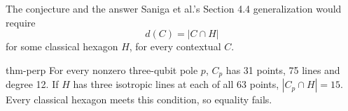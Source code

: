 \documentclass{beamer}
\begin{document}
\begin{frame}{The conjecture and the answer}
Saniga et al.'s Section 4.4 generalization would require
\[d(C)=|C\cap H|\]
for some classical hexagon $H$, for every contextual $C$.
\begin{bookresult}{thm-perp}
For every nonzero three-qubit pole $p$, $C_p$ has 31 points, 75 lines and degree 12. If $H$ has three isotropic lines at each of all 63 points, $|C_p\cap H|=15$. Every classical hexagon meets this condition, so equality fails.
\end{bookresult}
\end{frame}
\end{document}

